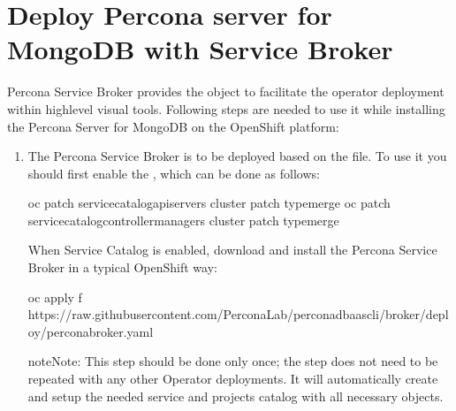 \documentclass[letterpaper,10pt,english]{sphinxmanual}
\begin{document}
\chapter{Deploy Percona server for MongoDB with Service Broker}
\label{\detokenize{broker:deploy-percona-server-for-mongodb-with-service-broker}}\label{\detokenize{broker::doc}}
Percona Service Broker provides the  object to facilitate the operator deployment within high\sphinxhyphen{}level visual tools. Following steps are needed to use it while installing the Percona Server for MongoDB on the OpenShift platform:
\begin{enumerate}
%
\item {} 
The Percona Service Broker is to be deployed based on the  file. To use it you should first enable the , which can be done as follows:

\begin{sphinxVerbatim}[commandchars=\\\{\}]
\PYGZdl{} oc patch servicecatalogapiservers cluster \PYGZhy{}\PYGZhy{}patch  \PYGZhy{}\PYGZhy{}typemerge
\PYGZdl{} oc patch servicecatalogcontrollermanagers cluster \PYGZhy{}\PYGZhy{}patch  \PYGZhy{}\PYGZhy{}typemerge
\end{sphinxVerbatim}

When Service Catalog is enabled, download and install the Percona Service
Broker in a typical OpenShift way:

\begin{sphinxVerbatim}[commandchars=\\\{\}]
\PYGZdl{} oc apply \PYGZhy{}f https://raw.githubusercontent.com/Percona\PYGZhy{}Lab/percona\PYGZhy{}dbaas\PYGZhy{}cli/broker/deploy/percona\PYGZhy{}broker.yaml
\end{sphinxVerbatim}

\begin{sphinxadmonition}{note}{Note:}
This step should be done only once; the step does not need to be repeated
with any other Operator deployments. It will automatically create and setup
the needed service and projects catalog with all necessary objects.
\end{sphinxadmonition}


\end{enumerate}
\end{document}
